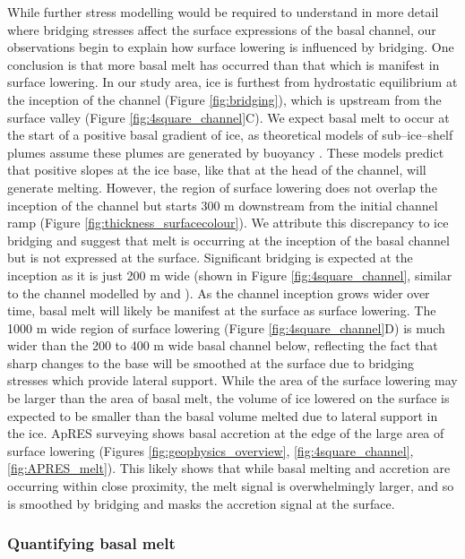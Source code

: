 While further stress modelling would be required to understand in more detail where bridging stresses affect the surface expressions of the basal channel, our observations begin to explain how surface lowering is influenced by bridging. One conclusion is that more basal melt has occurred than that which is manifest in surface lowering. %
In our study area, ice is furthest from hydrostatic equilibrium at the inception of the channel (Figure \ref{fig:bridging}), which is upstream from the surface valley (Figure \ref{fig:4square_channel}C). 
We expect basal melt to occur at the start of a positive basal gradient of ice, as theoretical models \cite [e.g.][] {jenkins2011convection} of sub--ice--shelf plumes assume these plumes are generated by buoyancy \citep{jenkins1991one}. These models predict that positive slopes at the ice base, like that at the head of the channel, will generate melting. 
However, the region of surface lowering does not overlap the inception of the channel but starts 300 m downstream from the initial channel ramp (Figure \ref{fig:thickness_surfacecolour}). 
We attribute this discrepancy to ice bridging and suggest that melt is occurring at the inception of the basal channel but is not expressed at the surface. Significant bridging is expected at the inception as it is just 200 m wide (shown in Figure \ref{fig:4square_channel}, similar to the channel modelled by \cite{drews2015evolution} and \cite{wearing2021ice}). As the channel inception grows wider over time, basal melt will likely be manifest at the surface as surface lowering. 
The 1000 m wide region of surface lowering (Figure \ref{fig:4square_channel}D) is much wider than the 200 to 400 m wide basal channel below, reflecting the fact that sharp changes to the base will be smoothed at the surface due to bridging  stresses which provide lateral support. While the area of the surface lowering may be larger than the area of basal melt, the volume of ice lowered on the surface is expected to be smaller than the basal volume melted due to lateral support in the ice.
ApRES surveying shows basal accretion at the edge of the large area of surface lowering (Figures \ref{fig:geophysics_overview}, \ref{fig:4square_channel}, \ref{fig:APRES_melt}). This likely shows that while basal melting and accretion are occurring within close proximity, the melt signal is overwhelmingly larger, and so is smoothed by bridging and masks the accretion signal at the surface.

\subsubsection{Quantifying basal melt} \label{sec:melt}

